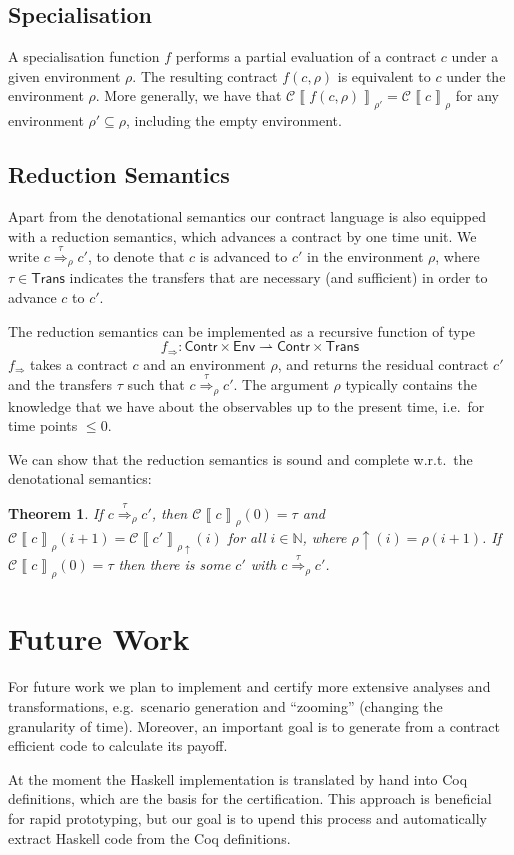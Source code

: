 \documentclass[a4paper,debug,twocolumn]{easychair}
\newcommand\type[1]{\mathsf{#1}}
\newcommand\nats{{\mathbb N}}
\newcommand\pto{\rightharpoonup}
\newcommand\cSem[2]{{\mathcal C}\left\llbracket#1\right\rrbracket_{#2}}
\newcommand\cRed[2]{\stackrel{#2}\Rightarrow_{#1}}
\newcommand\cRedFun{f_{\Rightarrow}}
\newcommand\envAdv[1]{#1\uparrow}
\theoremstyle{plain}
\newtheorem{theorem}{Theorem}
\begin{document}
\subsection{Specialisation}
\label{sec:specialisation}

A specialisation function $f$ performs a partial evaluation of a
contract $c$ under a given environment $\rho$. The resulting contract
$f(c,\rho)$ is equivalent to $c$ under the environment $\rho$. More
generally, we have that $\cSem{f(c,\rho)}{\rho'} = \cSem c \rho$ for
any environment $\rho' \subseteq \rho$, including the empty
environment.



\subsection{Reduction Semantics}
\label{sec:reduction-semantics}


Apart from the denotational semantics our contract language is also
equipped with a reduction semantics, which advances a contract by one
time unit. We write $c \cRed \rho \tau c'$, to denote that $c$ is
advanced to $c'$ in the environment $\rho$, where $\tau \in
\type{Trans}$ indicates the transfers that are necessary (and
sufficient) in order to advance $c$ to $c'$.

The reduction semantics can be implemented as a recursive function of
type 
\[
\cRedFun \colon\type{Contr}\times \type{Env} \pto \type{Contr} \times \type{Trans}
\]
$\cRedFun$ takes a contract $c$ and an environment $\rho$, and returns
the residual contract $c'$ and the transfers $\tau$ such that $c
\cRed\rho\tau c'$. The argument $\rho$ typically contains the
knowledge that we have about the observables up to the present time,
i.e.\ for time points $\leq 0$.

We can show that the reduction semantics is sound and complete w.r.t.\
the denotational semantics:
\begin{theorem}
  If $c \cRed\rho\tau c'$, then $\cSem c {\rho} (0) = \tau$ and $\cSem
  c {\rho} (i+1) = \cSem{c'}{\envAdv{\rho}}(i)$ for all $i \in \nats$,
  where $\envAdv{\rho} (i) = \rho(i+1)$. If $\cSem c \rho (0) = \tau$
  then there is some $c'$ with $c \cRed\rho\tau c'$.
\end{theorem}


\section{Future Work}
\label{sec:disc-future-work}

For future work we plan to implement and certify more extensive
analyses and transformations, e.g.\ scenario generation and
``zooming'' (changing the granularity of time). Moreover, an important
goal is to generate from a contract efficient code to calculate its
payoff.


At the moment the Haskell implementation is translated by hand into
Coq definitions, which are the basis for the certification. This
approach is beneficial for rapid prototyping, but our goal is to upend
this process and automatically extract Haskell code from the Coq
definitions.



\end{document}
